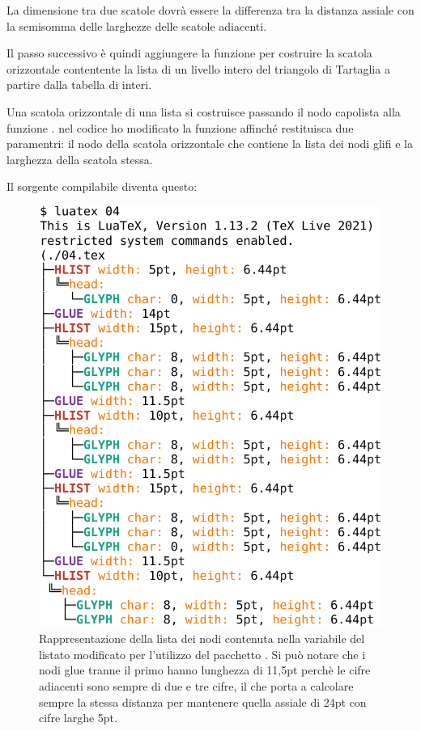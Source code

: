 La dimensione tra due scatole dovrà essere la differenza tra la distanza assiale
con la semisomma delle larghezze delle scatole adiacenti.

Il passo successivo è quindi aggiungere la funzione  per
costruire la scatola orizzontale contentente la lista di un livello intero del
triangolo di Tartaglia a partire dalla tabella di interi.

Una scatola orizzontale di una lista si costruisce passando il nodo capolista
alla funzione . nel codice ho modificato la funzione 
affinché restituisca due paramentri: il nodo della scatola orizzontale che
contiene la lista dei nodi glifi e la larghezza della scatola stessa.

Il sorgente compilabile diventa questo:

\begin{figure}
\includegraphics[scale=0.62]{image/nodetree-list-crop.pdf}
\caption{Rappresentazione della lista dei nodi contenuta nella variabile
 del listato  modificato per l'utilizzo del pacchetto
. Si può notare che i nodi glue tranne il primo hanno lunghezza
di 11,5pt perchè le cifre adiacenti sono sempre di due e tre cifre, il che porta
a calcolare sempre la stessa distanza per mantenere quella assiale di 24pt con
cifre larghe 5pt.}
\label{figNodetree}
\end{figure}

